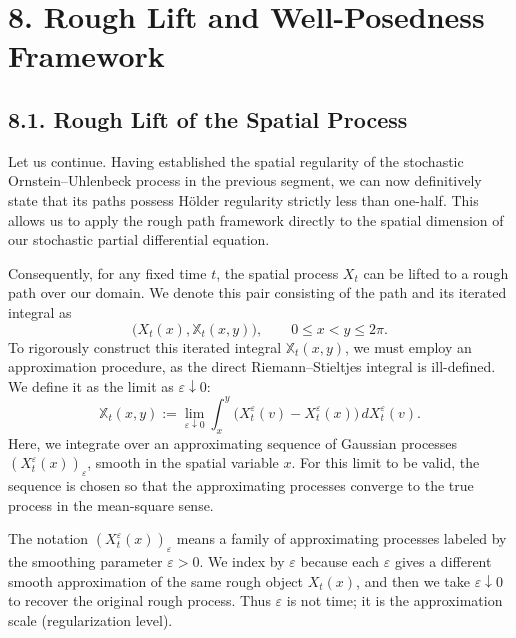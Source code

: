 \documentclass[11pt]{article}
\theoremstyle{definition}
\theoremstyle{remark}
\begin{document}
\section*{8. Rough Lift and Well-Posedness Framework}
\subsection*{8.1. Rough Lift of the Spatial Process}
Let us continue. Having established the spatial regularity of the stochastic Ornstein--Uhlenbeck process in the previous segment, we can now definitively state that its paths possess H\"older regularity strictly less than one-half. This allows us to apply the rough path framework directly to the spatial dimension of our stochastic partial differential equation.

Consequently, for any fixed time $t$, the spatial process $X_t$ can be lifted to a rough path over our domain. We denote this pair consisting of the path and its iterated integral as
\[
\bigl(X_t(x),\mathbb X_t(x,y)\bigr),
\qquad 0\le x<y\le 2\pi.
\]
To rigorously construct this iterated integral $\mathbb X_t(x,y)$, we must employ an approximation procedure, as the direct Riemann--Stieltjes integral is ill-defined. We define it as the limit as $\varepsilon\downarrow0$:
\[
\mathbb X_t(x,y)
:=
\lim_{\varepsilon\downarrow0}
\int_x^y\bigl(X_t^{\varepsilon}(v)-X_t^{\varepsilon}(x)\bigr)\,dX_t^{\varepsilon}(v).
\]
Here, we integrate over an approximating sequence of Gaussian processes $(X_t^{\varepsilon}(x))_{\varepsilon}$, smooth in the spatial variable $x$. For this limit to be valid, the sequence is chosen so that the approximating processes converge to the true process in the mean-square sense.

The notation $(X_t^{\varepsilon}(x))_{\varepsilon}$ means a family of approximating processes labeled by the smoothing parameter $\varepsilon>0$. We index by $\varepsilon$ because each $\varepsilon$ gives a different smooth approximation of the same rough object $X_t(x)$, and then we take $\varepsilon\downarrow 0$ to recover the original rough process. Thus $\varepsilon$ is not time; it is the approximation scale (regularization level).
\end{document}

